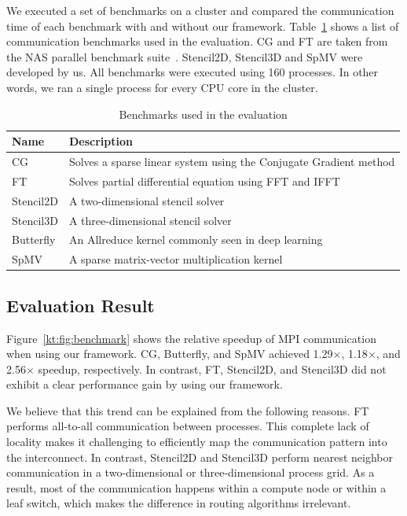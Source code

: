\documentclass[graybox]{svmult}
\begin{document}
We executed a set of benchmarks on a cluster and compared the communication
time of each benchmark with and without our framework.
Table~\ref{kt:tbl:miniapps} shows a list of communication benchmarks used in
the evaluation. CG and FT are taken from the NAS parallel benchmark
suite~\cite{Bailey1991}. Stencil2D, Stencil3D and SpMV were developed by us.
All benchmarks were executed using 160 processes. In other words, we ran a
single process for every CPU core in the cluster.

\begin{table}
\caption{Benchmarks used in the evaluation}%
\label{kt:tbl:miniapps}
\begin{tabular}{ll}
\toprule
Name      & Description \\ \midrule
CG        & Solves a sparse linear system using the Conjugate Gradient method \\
FT        & Solves partial differential equation using FFT and IFFT           \\
Stencil2D & A two-dimensional stencil solver                                  \\
Stencil3D & A three-dimensional stencil solver                                \\
Butterfly & An Allreduce kernel commonly seen in deep learning                \\
SpMV      & A sparse matrix-vector multiplication kernel                      \\ \bottomrule
\end{tabular}
\end{table}

\subsection{Evaluation Result}

Figure~\ref{kt:fig:benchmark} shows the relative speedup of MPI communication
when using our framework. CG, Butterfly, and SpMV achieved 1.29$\times$,
1.18$\times$, and 2.56$\times$ speedup, respectively. In contrast, FT,
Stencil2D, and Stencil3D did not exhibit a clear performance gain by using our
framework.

We believe that this trend can be explained from the following reasons. FT
performs all-to-all communication between processes. This complete lack of
locality makes it challenging to efficiently map the communication pattern
into the interconnect. In contrast, Stencil2D and Stencil3D perform nearest
neighbor communication in a two-dimensional or three-dimensional process grid.
As a result, most of the communication happens within a compute node or within
a leaf switch, which makes the difference in routing algorithms irrelevant.
\end{document}
